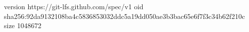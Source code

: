 version https://git-lfs.github.com/spec/v1
oid sha256:92da9132108ba4c5836853032ddc5a19dd050ae3b3bac65e6f7f3c34b62f210c
size 1048672
